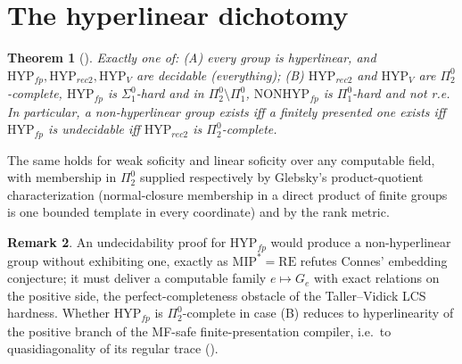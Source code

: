 \documentclass[11pt]{article}
\newtheorem{theorem}{Theorem}[section]
\theoremstyle{definition}
\newtheorem{remark}[theorem]{Remark}
\newcommand{\Pizt}{\Pi^0_2}\newcommand{\Sizt}{\Sigma^0_2}\newcommand{\Pith}{\Pi^0_3}\newcommand{\Sith}{\Sigma^0_3}
\newcommand{\Sio}{\Sigma^0_1}\newcommand{\Pio}{\Pi^0_1}
\begin{document}
\section{The hyperlinear dichotomy}
\begin{theorem}[]
Exactly one of: (A) every group is hyperlinear, and $\mathrm{HYP}_{fp},\mathrm{HYP}_{rec2},\mathrm{HYP}_V$ are decidable (everything); (B) $\mathrm{HYP}_{rec2}$ and $\mathrm{HYP}_V$ are $\Pizt$-complete, $\mathrm{HYP}_{fp}$ is $\Sio$-hard and in $\Pizt\setminus\Pio$, $\mathrm{NONHYP}_{fp}$ is $\Pio$-hard and not r.e. In particular, a non-hyperlinear group exists iff a finitely presented one exists iff $\mathrm{HYP}_{fp}$ is undecidable iff $\mathrm{HYP}_{rec2}$ is $\Pizt$-complete.
\end{theorem}
The same holds for weak soficity and linear soficity over any computable field, with membership in $\Pizt$ supplied respectively by Glebsky's product-quotient characterization (normal-closure membership in a direct product of finite groups is one bounded template in every coordinate) and by the rank metric.
\begin{remark}
An undecidability proof for $\mathrm{HYP}_{fp}$ would produce a non-hyperlinear group without exhibiting one, exactly as $\mathrm{MIP}^*=\mathrm{RE}$ refutes Connes' embedding conjecture; it must deliver a computable family $e\mapsto G_e$ with exact relations on the positive side, the perfect-completeness obstacle of the Taller--Vidick LCS hardness. Whether $\mathrm{HYP}_{fp}$ is $\Pizt$-complete in case (B) reduces to hyperlinearity of the positive branch of the MF-safe finite-presentation compiler, i.e.\ to quasidiagonality of its regular trace ().
\end{remark}
\end{document}
